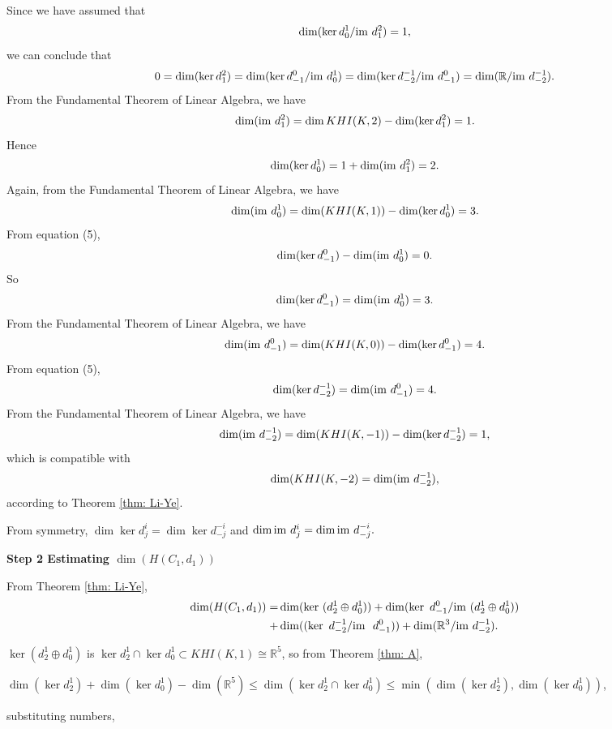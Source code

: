 \documentclass{amsart}
\theoremstyle{definition}
\newcommand{\im}{{\rm im~}}
\begin{document}
Since we have assumed that
\begin{equation}
    \dim (\ker d^1_0\slash \im d^2_1)=1,
\end{equation}
we can conclude that
\begin{equation}
    0= \dim (\ker d^2_1)= \dim(\ker d^0_{-1}/\im d^1_0)= \dim (\ker d^{-1}_{-2}/\im d^0_{-1})= \dim(\mathbb{R} / \im d^{-1}_{-2}).
\end{equation}
From the Fundamental Theorem of Linear Algebra, we have
$$\dim(\im d^2_1)=\dim KHI(K,2)-\dim (\ker d^2_1)=1.$$
Hence
$$\dim (\ker d^1_0) = 1+\dim(\im d^2_1)=2.$$
Again, from the Fundamental Theorem of Linear Algebra, we have
$$\dim(\im d^1_0)= \dim(KHI (K,1))-\dim (\ker d^1_0)=3.$$
From equation (5),
$$\dim(\ker d^0_{-1})-\dim (\im d^1_0)=0.$$
So
$$\dim(\ker d^0_{-1})=\dim (\im d^1_0)=3.$$
From the Fundamental Theorem of Linear Algebra, we have
$$\dim(\im d^0_{-1})=\dim(KHI(K,0))-\dim(\ker d^0_{-1})=4.$$
From equation (5),
$$\dim (\ker d^{-1}_{-2}) = \dim(\im d^0_{-1})=4.$$
From the Fundamental Theorem of Linear Algebra, we have
$$\dim(\im d^{-1}_{-2})=\dim(KHI(K,{-1}))-\dim (\ker d^{-1}_{-2})=1,$$
which is compatible with 
$$\dim(KHI(K,{-2})=\dim(\im d^{-1}_{-2}),$$
according to Theorem \ref{thm: Li-Ye}.

From symmetry, $\dim \ker d^i_j= \dim \ker d^{-i}_{-j}$
and $\dim \im d^i_j= \dim \im d^{-i}_{-j}.$

\textbf{Step 2 Estimating $\dim(H(C_1,d_1))$} 

From Theorem \ref{thm: Li-Ye},
\begin{equation}
    \begin{aligned}
       \dim(H(C_1,d_1))=&\dim(\ker~(d^1_2 \oplus d^1_0))+\dim(\ker~d^0_{-1}/\im(d^1_2 \oplus     d^1_0))\\+&\dim((\ker~d^{-1}_{-2}/\im~d^0_{-1}))+
        \dim(\mathbb{R}^3/\im d^{-1}_{-2}). 
    \end{aligned}
\end{equation}


$\ker(d^1_2 \oplus d^1_0)$ is $\ker d^{1}_{2} \cap \ker d^1_0 \subset KHI(K,1)\cong \mathbb{R}^5$, so from Theorem \ref{thm: A}, 

\begin{center}
${\dim(\ker d^{1}_{2}) + \dim(\ker d^1_0) - \dim (\mathbb{R}^5) }
\leq
{\dim(\ker d^{1}_{2} \cap \ker d^1_0)}
\leq
{\min (\dim(\ker d^{1}_{2}),\dim (\ker d^1_0))}$,
\end{center}


substituting numbers,
 
\end{document}

